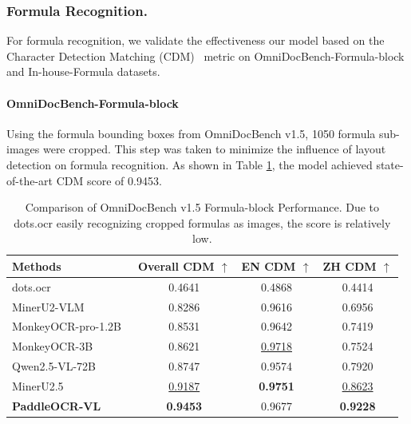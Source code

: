 \documentclass[11pt, a4paper,logo,  copyright, nonumbering]{paddleocr}
\begin{document}
\subsubsection{Formula Recognition.} For formula recognition, we validate the effectiveness our model based on the Character Detection Matching (CDM)~\cite{cdm} metric on OmniDocBench-Formula-block and In-house-Formula datasets. 


\paragraph{OmniDocBench-Formula-block} 

Using the formula bounding boxes from OmniDocBench v1.5, 1050 formula sub-images were cropped. This step was taken to minimize the influence of layout detection on formula recognition. As shown in Table \ref{result_on_omnidoc_formula}, the model achieved state-of-the-art CDM score of 0.9453. 

\begin{table}[H] 
    \centering
\fontsize{7}{7}\selectfont

    \setlength{\tabcolsep}{6pt} %
      \renewcommand{\arraystretch}{1.2}
    \begin{tabular}{l|ccc}
\toprule[.9pt]
\textbf{Methods} & \textbf{Overall CDM $\uparrow$} & \textbf{EN CDM $\uparrow$} & \textbf{ZH CDM $\uparrow$} \\
\midrule
dots.ocr~\cite{dotsocr} &0.4641 &0.4868 &0.4414 \\

MinerU2-VLM~\cite{MinerU2} &0.8286 &0.9616 &0.6956 \\

MonkeyOCR-pro-1.2B~\cite{li2025monkeyocr} &0.8531 &0.9642 &0.7419 \\

MonkeyOCR-3B ~\cite{li2025monkeyocr} &0.8621 &\cellcolor{cyan!15}\underline{0.9718} &0.7524 \\

Qwen2.5-VL-72B~\cite{bai2025qwen2} &0.8747 &0.9574 &0.7920 \\

MinerU2.5~\cite{niu2025mineru2} &\cellcolor{cyan!15}\underline{0.9187} &\cellcolor{red!15}\textbf{0.9751} &\cellcolor{cyan!15}\underline{0.8623} \\

\textbf{PaddleOCR-VL} &\cellcolor{red!15}\textbf{0.9453} &0.9677 &\cellcolor{red!15}\textbf{0.9228} \\

\bottomrule
\end{tabular}
\caption{Comparison of OmniDocBench v1.5 Formula-block Performance. Due to dots.ocr \cite{dotsocr} easily recognizing cropped formulas as images, the score is relatively low.}
\label{result_on_omnidoc_formula}
\end{table}
\end{document}
